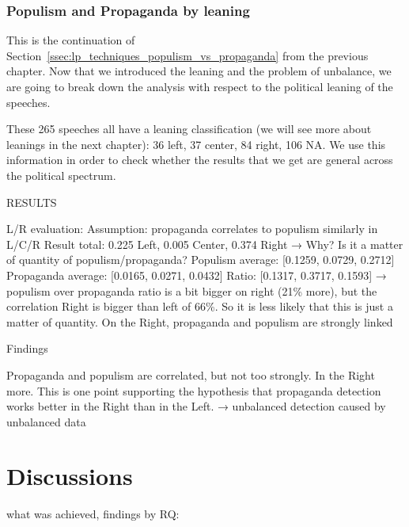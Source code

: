 \subsubsection{Populism and Propaganda by leaning}

This is the continuation of Section~\ref{ssec:lp_techniques_populism_vs_propaganda} from the previous chapter. Now that we introduced the leaning and the problem of unbalance, we are going to break down the analysis with respect to the political leaning of the speeches.

These 265 speeches all have a leaning classification (we will see more about leanings in the next chapter): 36 left, 37 center, 84 right, 106 NA. We use this information in order to check whether the results that we get are general across the political spectrum.

RESULTS

L/R evaluation:
Assumption: propaganda correlates to populism similarly in L/C/R
Result total: 0.225 Left, 0.005 Center, 0.374 Right → Why? Is it a matter of quantity of populism/propaganda?
Populism average:  [0.1259, 0.0729, 0.2712]
Propaganda average: [0.0165, 0.0271, 0.0432]
Ratio: [0.1317, 0.3717, 0.1593] → populism over propaganda ratio is a bit bigger on right (21\% more), but the correlation Right is bigger than left of 66\%. So it is less likely that this is just a matter of quantity. On the Right, propaganda and populism are strongly linked

Findings

Propaganda and populism are correlated, but not too strongly. In the Right more. This is one point supporting the hypothesis that propaganda detection works better in the Right than in the Left. → unbalanced detection caused by unbalanced data


\section{Discussions}
\label{sec:ps_discussions}

what was achieved, findings by RQ:

